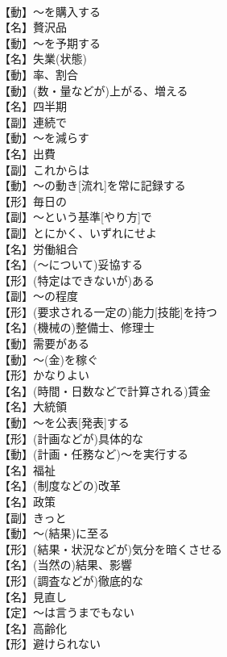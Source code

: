 \documentclass[8pt]{extreport}
\begin{document}
\begin{CJK}{UTF8}{min}
\\	【動】～を購入する
\\	【名】贅沢品
\\	【動】～を予期する
\\	【名】失業(状態)
\\	【動】率、割合
\\	【動】(数・量などが)上がる、増える
\\	【名】四半期
\\	【副】連続で
\\	【動】～を減らす
\\	【名】出費
\\	【副】これからは
\\	【動】～の動き[流れ]を常に記録する
\\	【形】毎日の
\\	【副】～という基準[やり方]で
\\	【副】とにかく、いずれにせよ
\\	【名】労働組合
\\	【名】(～について)妥協する
\\	【形】(特定はできないが)ある
\\	【副】～の程度
\\	【形】(要求される一定の)能力[技能]を持つ
\\	【名】(機械の)整備士、修理士
\\	【動】需要がある
\\	【動】～(金)を稼ぐ
\\	【形】かなりよい
\\	【名】(時間・日数などで計算される)賃金
\\	【名】大統領
\\	【動】～を公表[発表]する
\\	【形】(計画などが)具体的な
\\	【動】(計画・任務など)～を実行する
\\	【名】福祉
\\	【名】(制度などの)改革
\\	【名】政策
\\	【副】きっと
\\	【動】～(結果)に至る
\\	【形】(結果・状況などが)気分を暗くさせる
\\	【名】(当然の)結果、影響
\\	【形】(調査などが)徹底的な
\\	【名】見直し
\\	【定】～は言うまでもない
\\	【名】高齢化
\\	【形】避けられない

\end{CJK}
\end{document}
